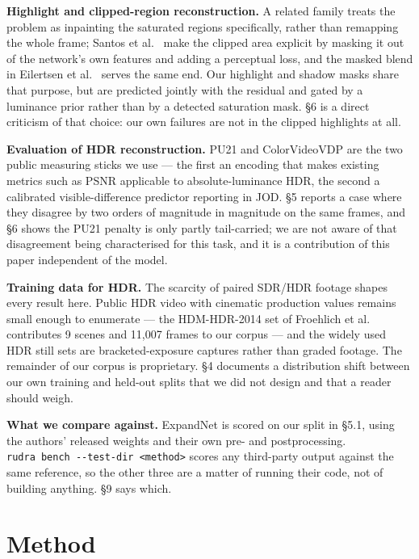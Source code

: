 \textbf{Highlight and clipped-region reconstruction.} A related family treats the
problem as inpainting the saturated regions specifically, rather than remapping
the whole frame; Santos et al.~\cite{santos2020} make the clipped area explicit by masking it
out of the network's own features and adding a perceptual loss, and the masked
blend in Eilertsen et al.~\cite{eilertsen2017} serves the same end. Our highlight and shadow
masks share that purpose, but are predicted jointly with the residual and gated
by a luminance prior rather than by a detected saturation mask. §6 is a direct
criticism of that choice: our own failures are not in the clipped highlights at
all.

\textbf{Evaluation of HDR reconstruction.} PU21 \cite{pu21} and ColorVideoVDP \cite{cvvdp} are the two
public measuring sticks we use --- the first an encoding that makes existing
metrics such as PSNR applicable to absolute-luminance HDR, the second a
calibrated visible-difference predictor reporting in JOD. §5 reports a case
where they disagree by two orders of magnitude in magnitude on the same frames,
and §6 shows the PU21 penalty is only partly tail-carried; we are not aware of
that disagreement being characterised for this task, and it is a contribution of
this paper independent of the model.

\textbf{Training data for HDR.} The scarcity of paired SDR/HDR footage shapes every
result here. Public HDR video with cinematic production values remains small
enough to enumerate --- the HDM-HDR-2014 set of Froehlich et al.~\cite{froehlich2014} contributes 9
scenes and 11,007 frames to our corpus --- and the widely used HDR still sets
\cite{kalantari2017} are bracketed-exposure captures rather than graded footage. The remainder of
our corpus is proprietary. §4 documents a distribution shift between our own
training and held-out splits that we did not design and that a reader should
weigh.

\textbf{What we compare against.} ExpandNet \cite{marnerides2018} is scored on our split in §5.1, using
the authors' released weights and their own pre- and postprocessing.
\texttt{rudra\ bench\ -\/-test-dir\ \textless{}method\textgreater{}} scores any third-party output against the same
reference, so the other three are a matter of running their code, not of
building anything. §9 says which.

\hypertarget{method}{%
\section{Method}\label{method}}

